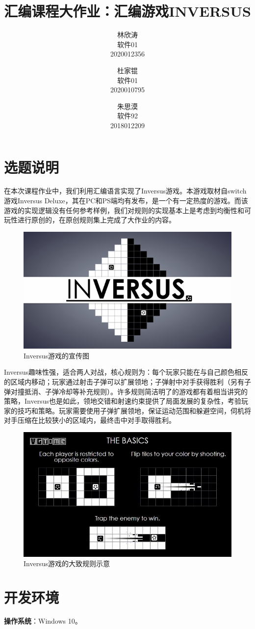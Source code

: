 \documentclass[lang=cn,11pt,a4paper]{elegantpaper}
\title{汇编课程大作业：汇编游戏INVERSUS}
\author{林欣涛 \\ 软件01 \\ 2020012356 \and 杜家锟 \\ 软件01 \\ 2020010795 \and 朱思漠 \\ 软件92 \\ 2018012209}
\date{}
\begin{document}
\maketitle

\section{选题说明}

在本次课程作业中，我们利用汇编语言实现了Inversus游戏。本游戏取材自switch游戏Inversus Deluxe，其在PC和PS端均有发布，是一个有一定热度的游戏。而该游戏的实现逻辑没有任何参考样例，我们对规则的实现基本上是考虑到均衡性和可玩性进行原创的，在原创规则集上完成了大作业的内容。

\begin{figure}[htbp]
    \centering
    \includegraphics[width=0.5\linewidth]{img/title.jpg}
    \caption{Inversus游戏的宣传图}
    \label{F1}
\end{figure}

Inversus趣味性强，适合两人对战，核心规则为：每个玩家只能在与自己颜色相反的区域内移动；玩家通过射击子弹可以扩展领地；子弹射中对手获得胜利（另有子弹对撞抵消、子弹冷却等补充规则）。许多规则简洁明了的游戏都有着相当讲究的策略，Inversus也是如此，领地交错和射速约束提供了局面发展的复杂性，考验玩家的技巧和策略。玩家需要使用子弹扩展领地，保证运动范围和躲避空间，伺机将对手压缩在比较狭小的区域内，最终击中对手取得胜利。

\begin{figure}[htbp]
    \centering
    \includegraphics[width=0.5\linewidth]{img/inversus.jpg}
    \caption{Inversus游戏的大致规则示意}
    \label{F2}
\end{figure}
\clearpage

\section{开发环境}
\noindent \textbf{操作系统}：Windows 10。
\end{document}

